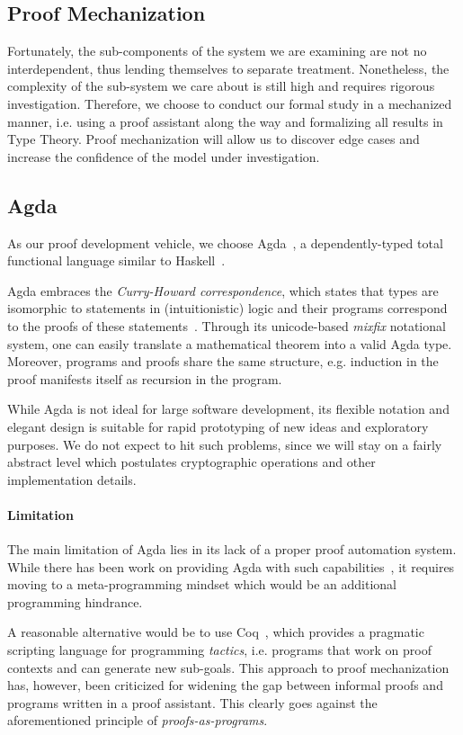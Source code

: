\documentclass[acmsmall,nonacm=true,screen=true]{acmart}
\begin{document}
\subsection{Proof Mechanization}
Fortunately, the sub-components of the system we are examining are not no interdependent,
thus lending themselves to separate treatment.
Nonetheless, the complexity of the sub-system we care about is still high and requires rigorous investigation.
Therefore, we choose to conduct our formal study in a mechanized manner, i.e. using a proof assistant
along the way and formalizing all results in Type Theory.
Proof mechanization will allow us to discover edge cases and increase the confidence of the model under investigation.

\subsection{Agda}
As our proof development vehicle, we choose Agda~\cite{agda}, a dependently-typed total functional language
similar to Haskell~\cite{haskell}.

Agda embraces the \textit{Curry-Howard correspondence}, which states that types are isomorphic to statements in
(intuitionistic) logic and their programs correspond to the proofs of these statements~\cite{itt}.
Through its unicode-based \textit{mixfix} notational system, one can easily translate a mathematical theorem
into a valid Agda type.
Moreover, programs and proofs share the same structure, e.g. induction
in the proof manifests itself as recursion in the program.

While Agda is not ideal for large software development, its flexible notation
and elegant design is suitable for rapid prototyping of new ideas and exploratory purposes.
We do not expect to hit such problems,
since we will stay on a fairly abstract level which postulates cryptographic operations and other implementation details.

\paragraph{Limitation}
The main limitation of Agda lies in its lack of a proper proof automation system.
While there has been work on providing Agda with such capabilities~\cite{agdaauto},
it requires moving to a meta-programming mindset which would be an additional programming hindrance.

A reasonable alternative would be to use Coq~\cite{coq}, which provides a pragmatic
scripting language for programming \textit{tactics}, i.e. programs that work on proof contexts and can
generate new sub-goals.
This approach to proof mechanization has, however, been criticized for widening the gap between informal proofs
and programs written in a proof assistant.
This clearly goes against the aforementioned principle of \textit{proofs-as-programs}.
\end{document}
